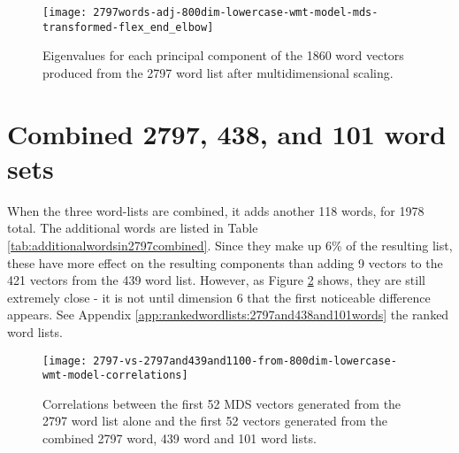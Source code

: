 \documentclass[eric_thesis.tex]{subfiles}
\begin{document}
\begin{figure}[tbp]
    \texttt{[image: 2797words-adj-800dim-lowercase-wmt-model-mds-transformed-flex\_end\_elbow]}
    \caption{Eigenvalues for each principal component of the 1860 word vectors
    produced from the 2797 word list after multidimensional scaling.}
    \label{fig:2797wordsmdseigenvalues}
\end{figure}


\section{Combined 2797, 438, and 101 word sets}

When the three word-lists are combined, it adds another 118 words, for 1978
total. The additional words are listed in Table 
\ref{tab:additionalwordsin2797combined}. Since they make up 6\% of the resulting
list, these have more effect on the resulting
components than adding 9 vectors to the 421 vectors from the 439 word list.
However, as Figure \ref{fig:2797vs2797and439and100} shows, they are still
extremely close - it is not until dimension 6 that the first noticeable
difference appears. See Appendix \ref{app:rankedwordlists:2797and438and101words}
the ranked word lists.


\begin{figure}[tbp]
    \texttt{[image: 2797-vs-2797and439and1100-from-800dim-lowercase-wmt-model-correlations]}
    \caption{Correlations between the first 52 MDS vectors generated from the 
    2797 word list alone and the first 52 vectors generated from the combined
    2797 word, 439 word and 101 word lists.}
    \label{fig:2797vs2797and439and100}
\end{figure}
\end{document}
